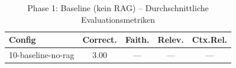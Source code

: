 \begin{table}[H]
\centering
\small
\begin{tabular}{lcccc}
\toprule
Config & Correct. & Faith. & Relev. & Ctx.Rel. \\
\midrule
10-baseline-no-rag & 3.00 & — & — & — \\
\bottomrule
\end{tabular}
\caption{Phase 1: Baseline (kein RAG) -- Durchschnittliche Evaluationsmetriken}
\label{tab:phase1_eval}
\end{table}